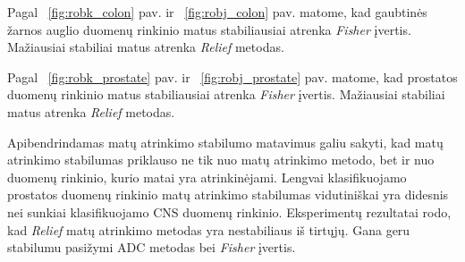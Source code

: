 Pagal ~\ref{fig:robk_colon} pav. ir ~\ref{fig:robj_colon} pav. matome, kad gaubtinės žarnos auglio duomenų rinkinio matus stabiliausiai atrenka \textit{Fisher} įvertis. Mažiausiai stabiliai matus atrenka \textit{Relief} metodas.

Pagal ~\ref{fig:robk_prostate} pav. ir ~\ref{fig:robj_prostate} pav. matome, kad prostatos duomenų rinkinio matus stabiliausiai atrenka \textit{Fisher} įvertis. Mažiausiai stabiliai matus atrenka \textit{Relief} metodas.

Apibendrindamas matų atrinkimo stabilumo matavimus galiu sakyti, kad matų atrinkimo stabilumas priklauso ne tik nuo matų atrinkimo metodo, bet ir nuo duomenų rinkinio, kurio matai yra atrinkinėjami. Lengvai klasifikuojamo prostatos duomenų rinkinio matų atrinkimo stabilumas vidutiniškai yra didesnis nei sunkiai klasifikuojamo CNS duomenų rinkinio. Eksperimentų rezultatai rodo, kad \textit{Relief} matų atrinkimo metodas yra nestabiliaus iš tirtųjų. Gana geru stabilumu pasižymi ADC metodas bei \textit{Fisher} įvertis.
